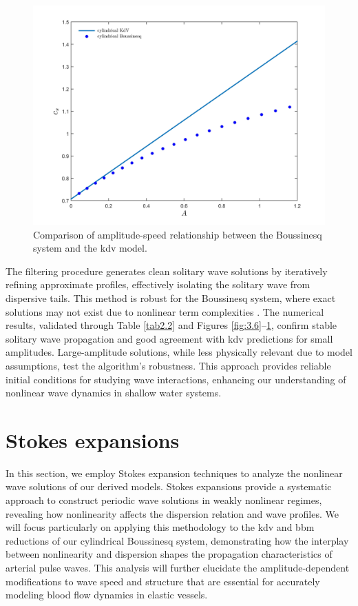 \documentclass[alpha-refs, 12pt]{wiley-article}
\begin{document}
\begin{figure}
  \centering
  \includegraphics[width=0.65\linewidth]{figs/my_figure1.jpg}
  \caption{Comparison of amplitude-speed relationship between the Boussinesq system and the \acrshort{kdv} model.}
  \label{fig:3.8}
\end{figure}

The filtering procedure generates clean solitary wave solutions by iteratively refining approximate profiles, effectively isolating the solitary wave from dispersive tails. This method is robust for the Boussinesq system, where exact solutions may not exist due to nonlinear term complexities \cite{BDM2}. The numerical results, validated through Table \ref{tab2.2} and Figures \ref{fig:3.6}--\ref{fig:3.8}, confirm stable solitary wave propagation and good agreement with \acrshort{kdv} predictions for small amplitudes. Large-amplitude solutions, while less physically relevant due to model assumptions, test the algorithm's robustness. This approach provides reliable initial conditions for studying wave interactions, enhancing our understanding of nonlinear wave dynamics in shallow water systems.

\section{Stokes expansions}\label{sec:stokes}

In this section, we employ Stokes expansion techniques to analyze the nonlinear wave solutions of our derived models. Stokes expansions provide a systematic approach to construct periodic wave solutions in weakly nonlinear regimes, revealing how nonlinearity affects the dispersion relation and wave profiles. We will focus particularly on applying this methodology to the \acrshort{kdv} and \acrshort{bbm} reductions of our cylindrical Boussinesq system, demonstrating how the interplay between nonlinearity and dispersion shapes the propagation characteristics of arterial pulse waves. This analysis will further elucidate the amplitude-dependent modifications to wave speed and structure that are essential for accurately modeling blood flow dynamics in elastic vessels.
\end{document}
